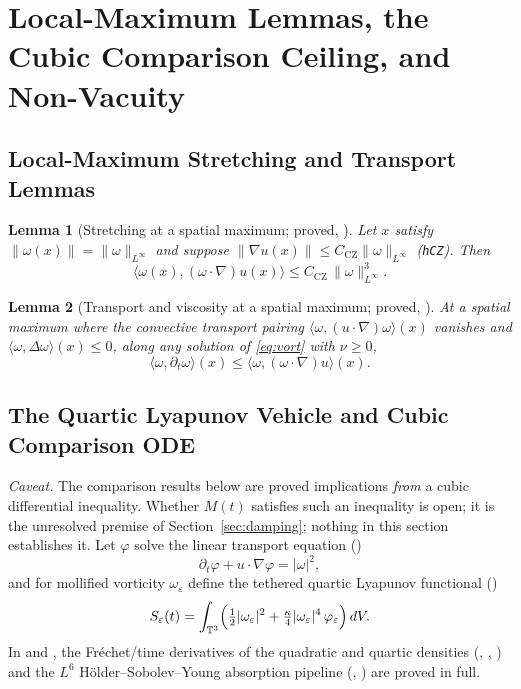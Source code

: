 \documentclass[11pt,a4paper]{article}
\theoremstyle{plain}
\newtheorem{lemma}{Lemma}[section]
\theoremstyle{definition}
\theoremstyle{remark}
\newcommand{\T}{\mathbb{T}^3}
\newcommand{\CZ}{C_{\mathrm{CZ}}}
\begin{document}
\section{Local-Maximum Lemmas, the Cubic Comparison Ceiling, and Non-Vacuity}\label{sec:cubic}

\subsection{Local-Maximum Stretching and Transport Lemmas}
\begin{lemma}[Stretching at a spatial maximum; proved, ]\label{lem:localmax}
Let $x$ satisfy $\|\omega(x)\|=\|\omega\|_{L^\infty}$ and suppose $\|\nabla u(x)\|\le\CZ\|\omega\|_{L^\infty}$ (\texttt{hCZ}). Then
\[
\langle\omega(x),(\omega\cdot\nabla)u(x)\rangle\le\CZ\,\|\omega\|_{L^\infty}^3 .
\]
\end{lemma}

\begin{lemma}[Transport and viscosity at a spatial maximum; proved, ]\label{lem:transport}
At a spatial maximum where the convective transport pairing $\langle\omega,(u\cdot\nabla)\omega\rangle(x)$ vanishes and $\langle\omega,\Delta\omega\rangle(x)\le0$, along any solution of \eqref{eq:vort} with $\nu\ge0$,
\[
\langle\omega,\partial_t\omega\rangle(x)\le\langle\omega,(\omega\cdot\nabla)u\rangle(x).
\]
\end{lemma}

\subsection{The Quartic Lyapunov Vehicle and Cubic Comparison ODE}
\emph{Caveat.} The comparison results below are proved implications \emph{from} a cubic differential inequality. Whether $M(t)$ satisfies such an inequality is open; it is the unresolved premise of Section~\ref{sec:damping}; nothing in this section establishes it.
Let $\varphi$ solve the linear transport equation ()
\begin{equation}\label{eq:phi}
\partial_t\varphi+u\cdot\nabla\varphi=|\omega|^2,
\end{equation}
and for mollified vorticity $\omega_\varepsilon$ define the tethered quartic Lyapunov functional ()
\begin{equation}\label{eq:S}
S_\varepsilon(t)=\int_{\T}\Bigl(\tfrac12|\omega_\varepsilon|^2+\tfrac{\kappa}{4}|\omega_\varepsilon|^4\,\varphi_\varepsilon\Bigr)\,dV .
\end{equation}
In  and , the Fréchet/time derivatives of the quadratic and quartic densities (, , ) and the $L^6$ Hölder--Sobolev--Young absorption pipeline (, ) are proved in full.
\end{document}
